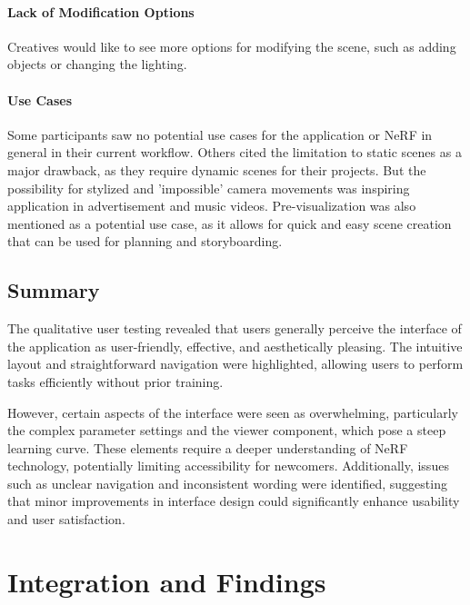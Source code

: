 \paragraph{Lack of Modification Options}
Creatives would like to see more options for modifying the scene, such as adding objects or changing the lighting.
\cite{P3}

\paragraph{Use Cases}
Some participants saw no potential use cases for the application or NeRF in general in their current workflow. 
\cite{P3}
Others cited the limitation to static scenes as a major drawback, as they require dynamic scenes for their projects. 
\cite{P4, P5}
But the possibility for stylized and 'impossible' camera movements was inspiring application in advertisement and music videos. 
\cite{P4}
Pre-visualization was also mentioned as a potential use case, as it allows for quick and easy scene creation that can be used for planning and storyboarding. 
\cite{P4}


\subsection*{Summary}
\label{sec:result:qualitative_summary}

The qualitative user testing revealed that users generally perceive the interface of the application as user-friendly, effective, and aesthetically pleasing.
The intuitive layout and straightforward navigation were highlighted, allowing users to perform tasks efficiently without prior training.

However, certain aspects of the interface were seen as overwhelming, particularly the complex parameter settings and the viewer component, which pose a steep learning curve.
These elements require a deeper understanding of NeRF technology, potentially limiting accessibility for newcomers.
Additionally, issues such as unclear navigation and inconsistent wording were identified, suggesting that minor improvements in interface design could significantly enhance usability and user satisfaction.

\section{Integration and Findings}
\label{sec:result:findings}

